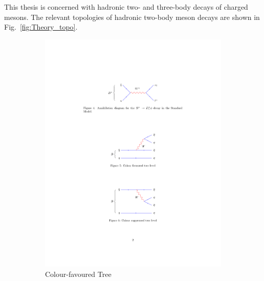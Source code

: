 This thesis is concerned with hadronic two- and three-body decays of charged \B mesons.
The relevant topologies of hadronic two-body \B meson decays are shown in Fig.~\ref{fig:Theory_topo}. 
\begin{figure}[!h]
    \centering
    \begin{subfigure}[b]{0.32\textwidth}
        \centering
        \includegraphics[width=1.0\textwidth]{figs/Theory/TreeFav.pdf}
        \caption{Colour-favoured Tree}
        \label{fig:theory_colour_fav}
    \end{subfigure}
    \begin{subfigure}[b]{0.32\textwidth}
        \centering

\end{subfigure}
\end{figure}
